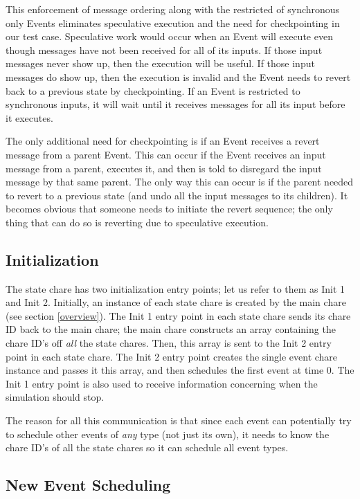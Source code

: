 This enforcement of message ordering along with the restricted of
synchronous only Events eliminates speculative execution and the need
for checkpointing in our test case.  Speculative work would occur when an Event
will execute even though messages have not been received for all of
its inputs.  If those input messages never show up, then the execution
will be useful.  If those input messages do show up, then the
execution is invalid and the Event needs to revert back to a previous
state by checkpointing.  If an
Event is restricted to synchronous inputs, it will wait until it
receives messages for all its input before it executes.

The only additional need for checkpointing is if an Event receives a revert
message from a parent Event.  This can occur if the Event receives an input
message from a parent, executes it, and then is told to disregard the
input message by that same parent.  The only way this can occur
is if the parent needed to revert to a previous state (and undo all the
input messages to its children).  It becomes obvious that someone
needs to initiate the revert sequence; the only thing that can do so
is reverting due to speculative execution.

\subsection{Initialization}

The state chare has two initialization entry points; let us refer to
them as Init 1 and Init 2.
Initially, an instance of each state chare is created by the main chare
(see section \ref{overview}).  The Init 1 entry point in each
state chare sends its chare ID back to the main chare;  the main chare
constructs an array containing the chare ID's off {\em all} the state
chares.  Then, this array is sent to the Init 2 entry point in each
state chare.  The Init 2 entry point creates the single event chare
instance and passes it this array, and then schedules the first event at
time 0.  The Init 1 entry point is also used to receive information
concerning when the simulation should stop.

The reason for all this communication is that since each event can
potentially try to schedule other events of {\em any} type (not just its
own), it needs to know the chare ID's of all the state chares so it can
schedule all event types.

\subsection{New Event Scheduling}

